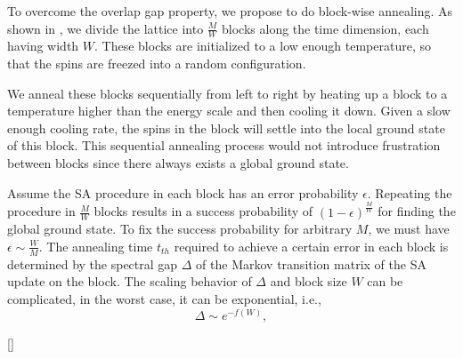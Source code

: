 \documentclass[twocolumn,superscriptaddress,english,showpacs,longbibliography]{revtex4-2}
\begin{document}
To overcome the overlap gap property, we propose to do block-wise annealing.
As shown in , we divide the lattice into $\frac{M}{W}$ blocks along the time dimension, each having width $W$.
These blocks are initialized to a low enough temperature, so that the spins are freezed into a random configuration.

We anneal these blocks sequentially from left to right by heating up a block to a temperature higher than the energy scale and then cooling it down.
Given a slow enough cooling rate, the spins in the block will settle into the local ground state of this block.
This sequential annealing process would not introduce frustration between blocks since there always exists a global ground state.

Assume the SA procedure in each block has an error probability $\epsilon$.
Repeating the procedure in $\frac{M}{W}$ blocks results in a success probability of $(1 - \epsilon)^{\frac{M}{W}}$ for finding the global ground state. 
To fix the success probability for arbitrary $M$, we must have $\epsilon \sim \frac{W}{M}$.
The annealing time $t_{th}$ required to achieve a certain error in each block is determined by the spectral gap $\Delta$ of the Markov transition matrix of the SA update on the block.
The scaling behavior of $\Delta$ and block size $W$ can be complicated, in the worst case, it can be exponential, i.e.,
\begin{equation}
    \label{eq:spectral-gap}
    \Delta \sim e^{-f(W)},
\end{equation}

[{}]
\end{document}
